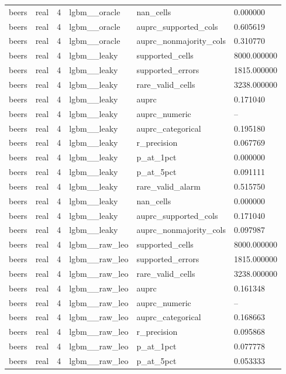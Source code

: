 \begin{tabular}{llllll}
beers & real & 4 & lgbm\_\_oracle & nan\_cells & 0.000000 \\
beers & real & 4 & lgbm\_\_oracle & auprc\_supported\_cols & 0.605619 \\
beers & real & 4 & lgbm\_\_oracle & auprc\_nonmajority\_cols & 0.310770 \\
beers & real & 4 & lgbm\_\_leaky & supported\_cells & 8000.000000 \\
beers & real & 4 & lgbm\_\_leaky & supported\_errors & 1815.000000 \\
beers & real & 4 & lgbm\_\_leaky & rare\_valid\_cells & 3238.000000 \\
beers & real & 4 & lgbm\_\_leaky & auprc & 0.171040 \\
beers & real & 4 & lgbm\_\_leaky & auprc\_numeric & -- \\
beers & real & 4 & lgbm\_\_leaky & auprc\_categorical & 0.195180 \\
beers & real & 4 & lgbm\_\_leaky & r\_precision & 0.067769 \\
beers & real & 4 & lgbm\_\_leaky & p\_at\_1pct & 0.000000 \\
beers & real & 4 & lgbm\_\_leaky & p\_at\_5pct & 0.091111 \\
beers & real & 4 & lgbm\_\_leaky & rare\_valid\_alarm & 0.515750 \\
beers & real & 4 & lgbm\_\_leaky & nan\_cells & 0.000000 \\
beers & real & 4 & lgbm\_\_leaky & auprc\_supported\_cols & 0.171040 \\
beers & real & 4 & lgbm\_\_leaky & auprc\_nonmajority\_cols & 0.097987 \\
beers & real & 4 & lgbm\_\_raw\_leo & supported\_cells & 8000.000000 \\
beers & real & 4 & lgbm\_\_raw\_leo & supported\_errors & 1815.000000 \\
beers & real & 4 & lgbm\_\_raw\_leo & rare\_valid\_cells & 3238.000000 \\
beers & real & 4 & lgbm\_\_raw\_leo & auprc & 0.161348 \\
beers & real & 4 & lgbm\_\_raw\_leo & auprc\_numeric & -- \\
beers & real & 4 & lgbm\_\_raw\_leo & auprc\_categorical & 0.168663 \\
beers & real & 4 & lgbm\_\_raw\_leo & r\_precision & 0.095868 \\
beers & real & 4 & lgbm\_\_raw\_leo & p\_at\_1pct & 0.077778 \\
beers & real & 4 & lgbm\_\_raw\_leo & p\_at\_5pct & 0.053333 \\

\end{tabular}
